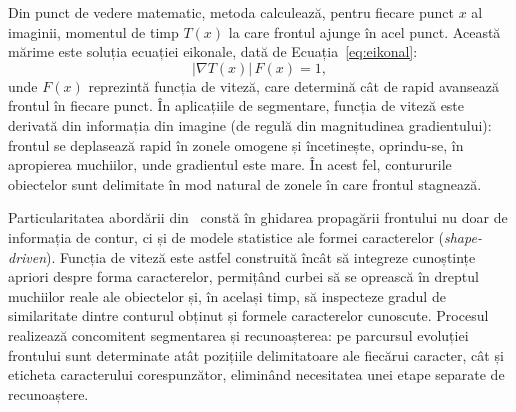 Din punct de vedere matematic, metoda calculează, pentru fiecare punct $x$ al imaginii, momentul de timp $T(x)$ la care frontul ajunge în acel punct. Această mărime este soluția ecuației eikonale, dată de Ecuația~\ref{eq:eikonal}:
\begin{equation}
        \lvert \nabla T(x) \rvert \, F(x) = 1,
        \label{eq:eikonal}
\end{equation}
unde $F(x)$ reprezintă funcția de viteză, care determină cât de rapid avansează frontul în fiecare punct. În aplicațiile de segmentare, funcția de viteză este derivată din informația din imagine (de regulă din magnitudinea gradientului): frontul se deplasează rapid în zonele omogene și încetinește, oprindu-se, în apropierea muchiilor, unde gradientul este mare. În acest fel, contururile obiectelor sunt delimitate în mod natural de zonele în care frontul stagnează.

Particularitatea abordării din~\cite{capar2006concurrent} constă în ghidarea propagării frontului nu doar de informația de contur, ci și de modele statistice ale formei caracterelor (\textit{shape-driven}). Funcția de viteză este astfel construită încât să integreze cunoștințe apriori despre forma caracterelor, permițând curbei să se oprească în dreptul muchiilor reale ale obiectelor și, în același timp, să inspecteze gradul de similaritate dintre conturul obținut și formele caracterelor cunoscute. Procesul realizează concomitent segmentarea și recunoașterea: pe parcursul evoluției frontului sunt determinate atât pozițiile delimitatoare ale fiecărui caracter, cât și eticheta caracterului corespunzător, eliminând necesitatea unei etape separate de recunoaștere.
